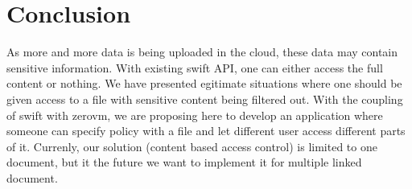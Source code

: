 \section{Conclusion}
As more and more data is being uploaded in the cloud, these data may contain sensitive information. With existing swift API, one can either access the full content or nothing. We have presented egitimate situations where one should be given access to a  file with sensitive content being filtered out.  With the coupling of swift with zerovm, we are proposing here to develop an application where someone can specify policy with a file and let different user access different parts of it. Currenly, our solution (content based access control) is limited to one document, but it the future we want to implement it for multiple linked document.